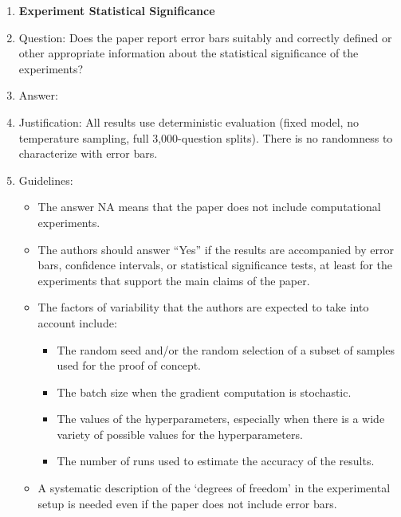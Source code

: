 \begin{enumerate}
\item {\bf Experiment Statistical Significance}
\item[] Question: Does the paper report error bars suitably and correctly
defined or other appropriate information about the statistical significance
of the experiments?
\item[] Answer: \answerNo{}
\item[] Justification: All results use deterministic evaluation (fixed model,
no temperature sampling, full 3,000-question splits). There is no randomness
to characterize with error bars.
\item[] Guidelines:
\begin{itemize}
    \item The answer NA means that the paper does not include computational
    experiments.
    \item The authors should answer ``Yes'' if the results are accompanied by
    error bars, confidence intervals, or statistical significance tests, at
    least for the experiments that support the main claims of the paper.
    \item The factors of variability that the authors are expected to take into
    account include:
    \begin{itemize}
        \item The random seed and/or the random selection of a subset of samples
        used for the proof of concept.
        \item The batch size when the gradient computation is stochastic.
        \item The values of the hyperparameters, especially when there is a wide
        variety of possible values for the hyperparameters.
        \item The number of runs used to estimate the accuracy of the results.
    \end{itemize}
    \item A systematic description of the `degrees of freedom' in the
    experimental setup is needed even if the paper does not include
    error bars.
\end{itemize}


\end{enumerate}
